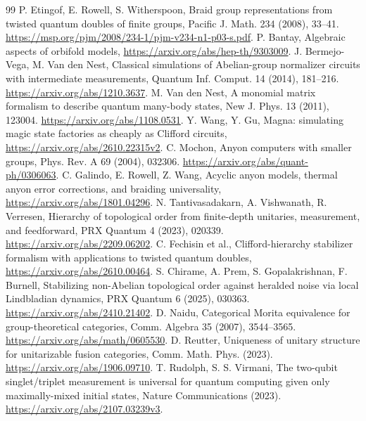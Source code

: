\documentclass[11pt]{amsart}
\theoremstyle{definition}\newtheorem{definition}[theorem]{Definition}
\begin{document}
\begin{thebibliography}{99}
 P. Etingof, E. Rowell, S. Witherspoon, Braid group representations
from twisted quantum doubles of finite groups, Pacific J. Math. 234 (2008), 33--41.
\url{https://msp.org/pjm/2008/234-1/pjm-v234-n1-p03-s.pdf}.
 P. Bantay, Algebraic aspects of orbifold models,
\url{https://arxiv.org/abs/hep-th/9303009}.
 J. Bermejo-Vega, M. Van den Nest, Classical simulations of
Abelian-group normalizer circuits with intermediate measurements,
Quantum Inf. Comput. 14 (2014), 181--216.
\url{https://arxiv.org/abs/1210.3637}.
 M. Van den Nest, A monomial matrix formalism to describe
quantum many-body states, New J. Phys. 13 (2011), 123004.
\url{https://arxiv.org/abs/1108.0531}.
 Y. Wang, Y. Gu, Magna: simulating magic state factories as
cheaply as Clifford circuits, \url{https://arxiv.org/abs/2610.22315v2}.
 C. Mochon, Anyon computers with smaller groups,
Phys. Rev. A 69 (2004), 032306. \url{https://arxiv.org/abs/quant-ph/0306063}.
 C. Galindo, E. Rowell, Z. Wang, Acyclic anyon models,
thermal anyon error corrections, and braiding universality,
\url{https://arxiv.org/abs/1801.04296}.
 N. Tantivasadakarn, A. Vishwanath, R. Verresen,
Hierarchy of topological order from finite-depth unitaries, measurement,
and feedforward, PRX Quantum 4 (2023), 020339.
\url{https://arxiv.org/abs/2209.06202}.
 C. Fechisin et al., Clifford-hierarchy stabilizer formalism
with applications to twisted quantum doubles,
\url{https://arxiv.org/abs/2610.00464}.
 S. Chirame, A. Prem, S. Gopalakrishnan, F. Burnell,
Stabilizing non-Abelian topological order against heralded noise via local
Lindbladian dynamics, PRX Quantum 6 (2025), 030363.
\url{https://arxiv.org/abs/2410.21402}.
 D. Naidu, Categorical Morita equivalence for group-theoretical
categories, Comm. Algebra 35 (2007), 3544--3565.
\url{https://arxiv.org/abs/math/0605530}.
 D. Reutter, Uniqueness of unitary structure for unitarizable
fusion categories, Comm. Math. Phys. (2023).
\url{https://arxiv.org/abs/1906.09710}.
 T. Rudolph, S. S. Virmani, The two-qubit singlet/triplet
measurement is universal for quantum computing given only maximally-mixed
initial states, Nature Communications (2023).
\url{https://arxiv.org/abs/2107.03239v3}.
\end{thebibliography}
\end{document}

